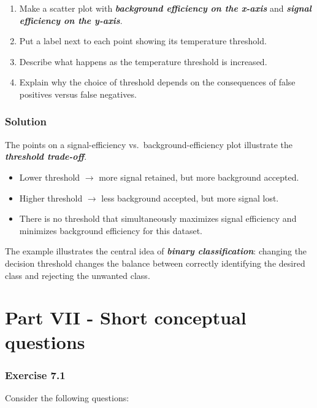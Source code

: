 \documentclass[10pt]{article}
\begin{document}
\begin{enumerate}
\item
Make a scatter plot with \textbf{\textit{background efficiency on the x-axis}} and \textbf{\textit{signal efficiency on the y-axis}}.

\item
Put a label next to each point showing its temperature threshold.

\item
Describe what happens as the temperature threshold is increased.

\item
Explain why the choice of threshold depends on the consequences of false positives versus false negatives.

\end{enumerate}
\begingroup\color{red}

\subsubsection*{Solution}
The points on a signal-efficiency vs. background-efficiency plot illustrate the \textbf{\textit{threshold trade-off}}.

\begin{itemize}
\item
Lower threshold $\to$ more signal retained, but more background accepted.

\item
Higher threshold $\to$ less background accepted, but more signal lost.

\item
There is no threshold that simultaneously maximizes signal efficiency and minimizes background efficiency for this dataset.

\end{itemize}
The example illustrates the central idea of \textbf{\textit{binary classification}}: changing the decision threshold changes the balance between correctly identifying the desired class and rejecting the unwanted class.

\par\endgroup

\clearpage
\section*{Part VII - Short conceptual questions}
\subsubsection*{Exercise 7.1}
Consider the following questions:
\end{document}
